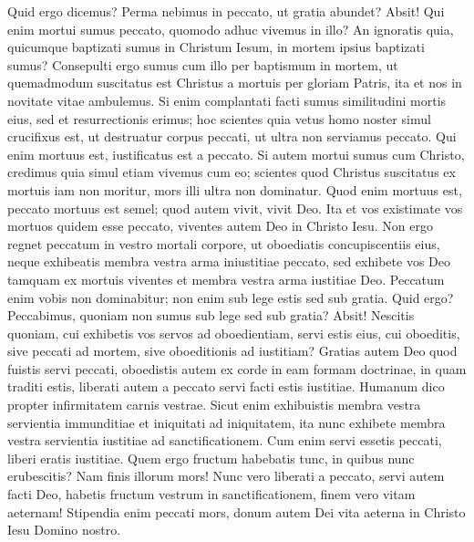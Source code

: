 \begin{biblechapter}  
\verse Quid ergo dicemus? Perma nebimus in peccato, ut gratia abundet? 
\verse Absit! Qui enim mortui sumus peccato, quomodo adhuc vivemus in illo? 
\verse An ignoratis quia, quicumque baptizati sumus in Christum Iesum, in mortem ipsius baptizati sumus? 
\verse Consepulti ergo sumus cum illo per baptismum in mortem, ut quemadmodum suscitatus est Christus a mortuis per gloriam Patris, ita et nos in novitate vitae ambulemus. 
\verse Si enim complantati facti sumus similitudini mortis eius, sed et resurrectionis erimus; 
\verse hoc scientes quia vetus homo noster simul crucifixus est, ut destruatur corpus peccati, ut ultra non serviamus peccato. 
\verse Qui enim mortuus est, iustificatus est a peccato. 
\verse Si autem mortui sumus cum Christo, credimus quia simul etiam vivemus cum eo;  
\verse scientes quod Christus suscitatus ex mortuis iam non moritur, mors illi ultra non dominatur. 
\verse Quod enim mortuus est, peccato mortuus est semel; quod autem vivit, vivit Deo. 
\verse Ita et vos existimate vos mortuos quidem esse peccato, viventes autem Deo in Christo Iesu. 
\verse Non ergo regnet peccatum in vestro mortali corpore, ut oboediatis concupiscentiis eius, 
\verse neque exhibeatis membra vestra arma iniustitiae peccato, sed exhibete vos Deo tamquam ex mortuis viventes et membra vestra arma iustitiae Deo. 
\verse Peccatum enim vobis non dominabitur; non enim sub lege estis sed sub gratia. 
\verse Quid ergo? Peccabimus, quoniam non sumus sub lege sed sub gratia? Absit!  
\verse Nescitis quoniam, cui exhibetis vos servos ad oboedientiam, servi estis eius, cui oboeditis, sive peccati ad mortem, sive oboeditionis ad iustitiam? 
\verse Gratias autem Deo quod fuistis servi peccati, oboedistis autem ex corde in eam formam doctrinae, in quam traditi estis, 
\verse liberati autem a peccato servi facti estis iustitiae. 
\verse Humanum dico propter infirmitatem carnis vestrae. Sicut enim exhibuistis membra vestra servientia immunditiae et iniquitati ad iniquitatem, ita nunc exhibete membra vestra servientia iustitiae ad sanctificationem. 
\verse Cum enim servi essetis peccati, liberi eratis iustitiae. 
\verse Quem ergo fructum habebatis tunc, in quibus nunc erubescitis? Nam finis illorum mors! 
\verse Nunc vero liberati a peccato, servi autem facti Deo, habetis fructum vestrum in sanctificationem, finem vero vitam aeternam! 
\verse Stipendia enim peccati mors, donum autem Dei vita aeterna in Christo Iesu Domino nostro. 
\end{biblechapter}

